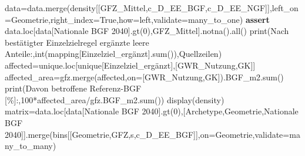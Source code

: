 \documentclass[
  ngerman,
  a4paper,
  DIV=11]{scrreprt}
\newenvironment{Shaded}{\begin{snugshade}}{\end{snugshade}}
\newcommand{\BuiltInTok}[1]{\textcolor[rgb]{0.00,0.23,0.31}{#1}}
\newcommand{\ControlFlowTok}[1]{\textcolor[rgb]{0.00,0.23,0.31}{\textbf{#1}}}
\newcommand{\DecValTok}[1]{\textcolor[rgb]{0.68,0.00,0.00}{#1}}
\newcommand{\NormalTok}[1]{\textcolor[rgb]{0.00,0.23,0.31}{#1}}
\newcommand{\OperatorTok}[1]{\textcolor[rgb]{0.37,0.37,0.37}{#1}}
\newcommand{\StringTok}[1]{\textcolor[rgb]{0.13,0.47,0.30}{#1}}
\newcommand{\VariableTok}[1]{\textcolor[rgb]{0.07,0.07,0.07}{#1}}
\begin{document}
\begin{Shaded}
\begin{Highlighting}[]
\NormalTok{data}\OperatorTok{=}\NormalTok{data.merge(density[[}\StringTok{\textquotesingle{}GFZ\_Mittel\textquotesingle{}}\NormalTok{,}\StringTok{\textquotesingle{}c\_D\_EE\_BGF\textquotesingle{}}\NormalTok{,}\StringTok{\textquotesingle{}c\_D\_EE\_NGF\textquotesingle{}}\NormalTok{]],left\_on}\OperatorTok{=}\StringTok{\textquotesingle{}Geometrie\textquotesingle{}}\NormalTok{,right\_index}\OperatorTok{=}\VariableTok{True}\NormalTok{,how}\OperatorTok{=}\StringTok{\textquotesingle{}left\textquotesingle{}}\NormalTok{,validate}\OperatorTok{=}\StringTok{\textquotesingle{}many\_to\_one\textquotesingle{}}\NormalTok{)}
\ControlFlowTok{assert}\NormalTok{ data.loc[data[}\StringTok{\textquotesingle{}Nationale BGF 2040\textquotesingle{}}\NormalTok{].gt(}\DecValTok{0}\NormalTok{),}\StringTok{\textquotesingle{}GFZ\_Mittel\textquotesingle{}}\NormalTok{].notna().}\BuiltInTok{all}\NormalTok{()}
\BuiltInTok{print}\NormalTok{(}\StringTok{\textquotesingle{}Nach bestätigter Einzelzielregel ergänzte leere Anteile:\textquotesingle{}}\NormalTok{,}\BuiltInTok{int}\NormalTok{(mapping[}\StringTok{\textquotesingle{}Einzelziel\_ergänzt\textquotesingle{}}\NormalTok{].}\BuiltInTok{sum}\NormalTok{()),}\StringTok{\textquotesingle{}Quellzeilen\textquotesingle{}}\NormalTok{)}
\NormalTok{affected}\OperatorTok{=}\NormalTok{unique.loc[unique[}\StringTok{\textquotesingle{}Einzelziel\_ergänzt\textquotesingle{}}\NormalTok{],[}\StringTok{\textquotesingle{}GWR\_Nutzung\textquotesingle{}}\NormalTok{,}\StringTok{\textquotesingle{}GK\textquotesingle{}}\NormalTok{]]}
\NormalTok{affected\_area}\OperatorTok{=}\NormalTok{gfz.merge(affected,on}\OperatorTok{=}\NormalTok{[}\StringTok{\textquotesingle{}GWR\_Nutzung\textquotesingle{}}\NormalTok{,}\StringTok{\textquotesingle{}GK\textquotesingle{}}\NormalTok{]).BGF\_m2.}\BuiltInTok{sum}\NormalTok{()}
\BuiltInTok{print}\NormalTok{(}\StringTok{\textquotesingle{}Davon betroffene Referenz{-}BGF [\%]:\textquotesingle{}}\NormalTok{,}\DecValTok{100}\OperatorTok{*}\NormalTok{affected\_area}\OperatorTok{/}\NormalTok{gfz.BGF\_m2.}\BuiltInTok{sum}\NormalTok{())}
\NormalTok{display(density)}
\NormalTok{matrix}\OperatorTok{=}\NormalTok{data.loc[data[}\StringTok{\textquotesingle{}Nationale BGF 2040\textquotesingle{}}\NormalTok{].gt(}\DecValTok{0}\NormalTok{),[}\StringTok{\textquotesingle{}Archetype\textquotesingle{}}\NormalTok{,}\StringTok{\textquotesingle{}Geometrie\textquotesingle{}}\NormalTok{,}\StringTok{\textquotesingle{}Nationale BGF 2040\textquotesingle{}}\NormalTok{]].merge(bins[[}\StringTok{\textquotesingle{}Geometrie\textquotesingle{}}\NormalTok{,}\StringTok{\textquotesingle{}GFZ\textquotesingle{}}\NormalTok{,}\StringTok{\textquotesingle{}s\textquotesingle{}}\NormalTok{,}\StringTok{\textquotesingle{}c\_D\_EE\_BGF\textquotesingle{}}\NormalTok{]],on}\OperatorTok{=}\StringTok{\textquotesingle{}Geometrie\textquotesingle{}}\NormalTok{,validate}\OperatorTok{=}\StringTok{\textquotesingle{}many\_to\_many\textquotesingle{}}\NormalTok{)}

\end{Highlighting}
\end{Shaded}
\end{document}

